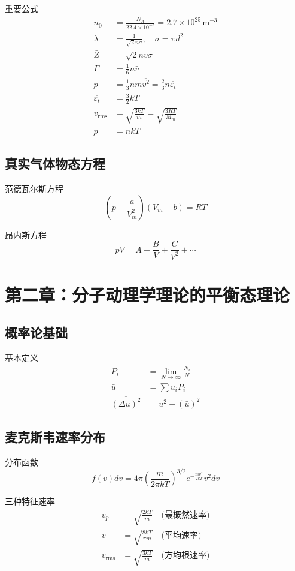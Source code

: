 \documentclass[12pt]{article}
\begin{document}
重要公式
\begin{align*}
    n_0 &= \frac{N_A}{22.4 \times 10^{-3}} = 2.7 \times 10^{25} \, \text{m}^{-3} \\
    \bar{\lambda} &= \frac{1}{\sqrt{2}n\sigma}, \quad \sigma = \pi d^2 \\
    \bar{Z} &= \sqrt{2}n\bar{v}\sigma \\
    \Gamma &= \frac{1}{6}n\bar{v} \\
    p &= \frac{1}{3}nm\overline{v^2} = \frac{2}{3}n\overline{\varepsilon_t} \\
    \overline{\varepsilon_t} &= \frac{3}{2}kT \\
    v_{\text{rms}} &= \sqrt{\frac{3kT}{m}} = \sqrt{\frac{3RT}{M_m}} \\
    p &= nkT
\end{align*}

\subsection{真实气体物态方程}
范德瓦尔斯方程
\[
\left(p + \frac{a}{V_m^2}\right)(V_m - b) = RT
\]

昂内斯方程
\[
pV = A + \frac{B}{V} + \frac{C}{V^2} + \cdots
\]

\section{第二章：分子动理学理论的平衡态理论}
\subsection{概率论基础}
基本定义
\begin{align*}
    P_i &= \lim_{N \to \infty} \frac{N_i}{N} \\
    \bar{u} &= \sum u_i P_i \\
    \overline{(\Delta u)^2} &= \overline{u^2} - (\bar{u})^2
\end{align*}

\subsection{麦克斯韦速率分布}
分布函数
\[
f(v)dv = 4\pi\left(\frac{m}{2\pi kT}\right)^{3/2} e^{-\frac{mv^2}{2kT}} v^2 dv
\]

三种特征速率
\begin{align*}
    v_p &= \sqrt{\frac{2kT}{m}} \quad \text{(最概然速率)} \\
    \bar{v} &= \sqrt{\frac{8kT}{\pi m}} \quad \text{(平均速率)} \\
    v_{\text{rms}} &= \sqrt{\frac{3kT}{m}} \quad \text{(方均根速率)}
\end{align*}
\end{document}
